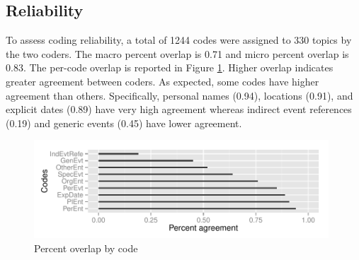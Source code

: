 \documentclass[runningheads,a4paper]{llncs}
\begin{document}

\subsection{Reliability}

To assess coding reliability, a total of 1244 codes were assigned to 330 topics by the two coders. The macro percent overlap is 0.71 and  micro percent overlap is 0.83. The per-code overlap is reported in Figure \ref{fig.overlap}. Higher overlap indicates greater agreement between coders. As expected, some codes have higher agreement than others. Specifically, personal names (0.94), locations (0.91), and explicit dates (0.89) have very high agreement whereas indirect event references (0.19) and generic events (0.45) have lower agreement.

\begin{figure}
\includegraphics[width=11cm]{plots/coder-agreement.pdf}
\caption{Percent overlap by code} 
\label{fig.overlap}
\end{figure}
\end{document}

